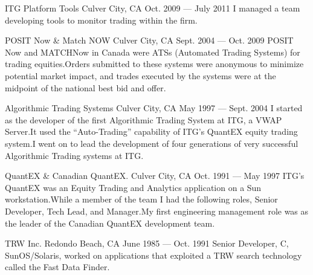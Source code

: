 \begin{cventries}

    {ITG Platform Tools} %
    {Culver City, CA} %
    {Oct. 2009 --- July 2011} %
    {I managed a team developing tools to monitor trading within the firm.}

    {POSIT Now \& Match NOW} %
    {Culver City, CA} %
    {Sept. 2004 --- Oct. 2009} %
    {POSIT Now and MATCHNow in Canada were ATSs (Automated Trading Systems)
for trading equities.\@ Orders submitted to these systems were
anonymous to minimize potential market impact, and trades executed by
the systems were at the midpoint of the national best bid and offer.}

    {Algorithmic Trading Systems} %
    {Culver City, CA} %
    {May 1997 --- Sept. 2004} %
    {I started as the developer of the first Algorithmic Trading System at
ITG, a VWAP Server.\@ It used the ``Auto-Trading'' capability of ITG's
QuantEX equity trading system.\@ I went on to lead the development of
four generations of very successful Algorithmic Trading systems at
ITG.}

    {QuantEX \& Canadian QuantEX.} %
    {Culver City, CA} %
    {Oct. 1991 --- May 1997} %
    {ITG's QuantEX was an Equity Trading and Analytics application on a Sun
workstation.\@ While a member of the team I had the following roles,
Senior Developer, Tech Lead, and Manager.\@ My first engineering
management role was as the leader of the Canadian QuantEX development
team.}

\end{cventries}



\begin{cventries}

    {TRW Inc.} %
    {Redondo Beach, CA} %
    {June 1985 --- Oct. 1991} %
    {Senior Developer, C, SunOS/Solaris, worked on applications that exploited a TRW search technology called the Fast Data Finder.}

\end{cventries}


